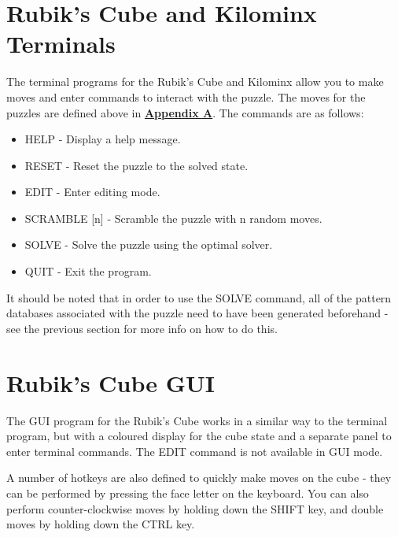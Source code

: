 \section{Rubik's Cube and Kilominx Terminals}
The terminal programs for the Rubik's Cube and Kilominx allow you to make moves and enter commands to interact with the puzzle. The moves for the puzzles are defined above in \textbf{\hyperref[section:moves]{Appendix A}}. The commands are as follows:
\begin{itemize}
    \item HELP - Display a help message.
    \item RESET - Reset the puzzle to the solved state.
    \item EDIT - Enter editing mode.
    \item SCRAMBLE [n] - Scramble the puzzle with n random moves.
    \item SOLVE - Solve the puzzle using the optimal solver.
    \item QUIT - Exit the program.
\end{itemize}
It should be noted that in order to use the SOLVE command, all of the pattern databases associated with the puzzle need to have been generated beforehand - see the previous section for more info on how to do this.

\section{Rubik's Cube GUI}
The GUI program for the Rubik's Cube works in a similar way to the terminal program, but with a coloured display for the cube state and a separate panel to enter terminal commands. The EDIT command is not available in GUI mode.

A number of hotkeys are also defined to quickly make moves on the cube - they can be performed by pressing the face letter on the keyboard. You can also perform counter-clockwise moves by holding down the SHIFT key, and double moves by holding down the CTRL key.